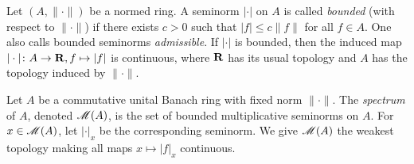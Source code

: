 Let $(A,\|\cdot\|)$ be a normed ring. A seminorm $|\cdot|$ on $A$ is called 
\emph{bounded} (with respect to $\|\cdot\|$) if there exists $c>0$ such that 
$|f|\leqslant c\|f\|$ for all $f\in A$. One also calls bounded seminorms 
\emph{admissible}. If $|\cdot|$ is bounded, then the induced map 
$|\cdot|\colon A\to \mathbf{R},f\mapsto |f|$ is continuous, where $\mathbf{R}$ has its usual 
topology and $A$ has the topology induced by $\|\cdot\|$. 

\begin{definition}
Let $A$ be a commutative unital Banach ring with fixed norm $\|\cdot\|$. The 
\emph{spectrum} of $A$, denoted $\operatorname{\mathscr{M}}(A)$, is the set of bounded 
multiplicative seminorms on $A$. For $x\in \operatorname{\mathscr{M}}(A)$, let $|\cdot|_x$ be 
the corresponding seminorm. We give $\operatorname{\mathscr{M}}(A)$ the weakest topology making 
all maps $x\mapsto |f|_x$ continuous. 
\end{definition}

